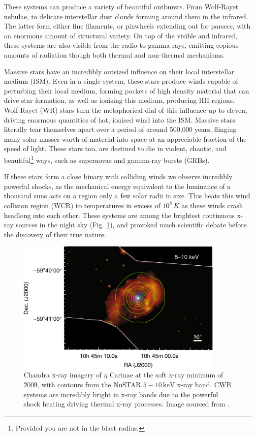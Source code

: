 These systems can produce a variety of beautiful outbursts.
From Wolf-Rayet nebulae, to delicate interstellar dust clouds forming around them in the infrared.
The latter form either fine filaments, or pinwheels extending out for parsecs, with an enormous amount of structural variety.
On top of the visible and infrared, these systems are also visible from the radio to gamma rays, emitting copious amounts of radiation though both thermal and non-thermal mechanisms.

Massive stars have an incredibly outsized influence on their local interstellar medium (ISM).
Even in a single system, these stars produce winds capable of perturbing their local medium, forming pockets of high density material that can drive star formation, as well as ionising this medium, producing HII regions.
Wolf-Rayet (WR) stars turn the metaphorical dial of this influence up to eleven, driving enormous quantities of hot, ionised wind into the ISM.
Massive stars literally tear themselves apart over a period of around 500,000 years, flinging many solar masses worth of material into space at an appreciable fraction of the speed of light.
These stars too, are destined to die in violent, chaotic, and beautiful\footnote{Provided you are not in the blast radius.} ways, such as supernovae and gamma-ray bursts (GRBs).

If these stars form a close binary with colliding winds we observe incredibly powerful shocks, as the mechanical energy equivalent to the luminance of a thousand suns acts on a region only a few solar radii in size.
This heats this wind collision region (WCR) to temperatures in excess of $10^8 \, \si{K}$ as these winds crash headlong into each other.
These systems are among the brightest continuous x-ray sources in the night sky (Fig. \ref{fig:intro-xray}), and provoked much scientific debate before the discovery of their true nature. 

\begin{figure}[ht]
  \centering
  \includegraphics[width=4in]{assets/wolf-rayets/x-ray.png}
  \caption[\emph{Chandra \& NuSTAR imagery of $\eta$ Carinae \parencite{hamaguchiNonthermalXraysColliding2018}}]{Chandra x-ray imagery of $\eta$ Carinae at the soft x-ray minimum of 2009, with contours from the NuSTAR $5-10 \, \si{\kilo\electronvolt}$ x-ray band. CWB systems are incredibly bright in x-ray bands due to the powerful shock heating driving thermal x-ray processes. Image sourced from \textcite{hamaguchiNonthermalXraysColliding2018}.}
  \label{fig:intro-xray}
\end{figure}

